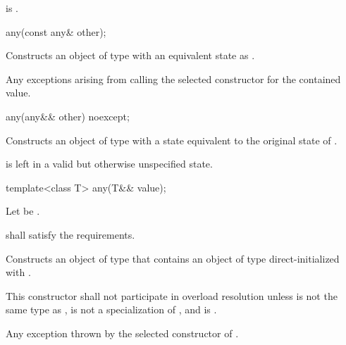 \begin{itemdescr}
\pnum
\postconditions
{} is .
\end{itemdescr}

%
\begin{itemdecl}
any(const any& other);
\end{itemdecl}

\begin{itemdescr}
\pnum
\effects
Constructs an object of type  with an equivalent state as .

\pnum
\throws
Any exceptions arising from calling the selected constructor for the contained value.
\end{itemdescr}

%
\begin{itemdecl}
any(any&& other) noexcept;
\end{itemdecl}

\begin{itemdescr}
\pnum
\effects
Constructs an object of type  with a state equivalent to the original state of .

\pnum
\postconditions
{} is left in a valid but otherwise unspecified state.
\end{itemdescr}

%
\begin{itemdecl}
template<class T>
  any(T&& value);
\end{itemdecl}

\begin{itemdescr}
\pnum
Let  be .

\pnum
\requires
{} shall satisfy the  requirements.

\pnum
\effects
Constructs an object of type  that contains an object of type  direct-initialized with .

\pnum
\remarks
This constructor shall not participate in overload resolution unless
 is not the same type as ,
 is not a specialization of ,
and  is .

\pnum
\throws
Any exception thrown by the selected constructor of .
\end{itemdescr}

